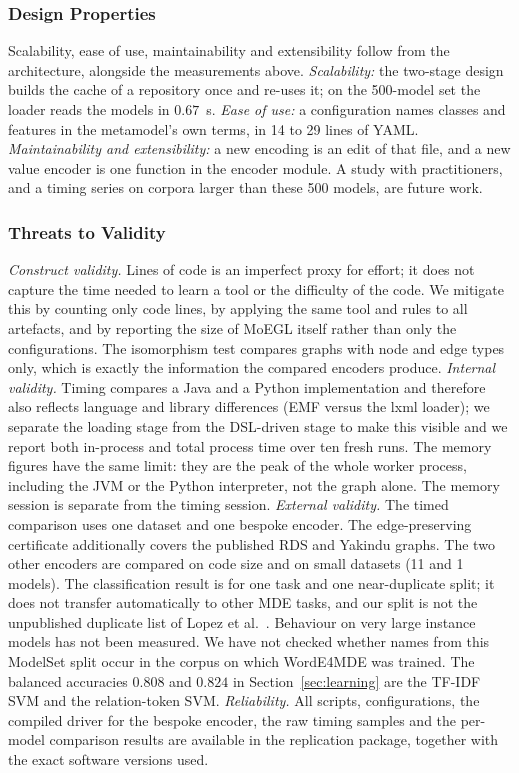 \documentclass[journal,article,submit,moreauthors,technologies]{Definitions/mdpi}
\newcommand{\rev}[1]{#1}
\begin{document}
\subsubsection{\rev{Design Properties}}

\rev{Scalability, ease of use, maintainability and extensibility follow from the architecture, alongside the measurements above. \emph{Scalability:} the two-stage design builds the cache of a repository once and re-uses it; on the 500-model set the loader reads the models in $0.67$~s. \emph{Ease of use:} a configuration names classes and features in the metamodel's own terms, in 14 to 29 lines of YAML. \emph{Maintainability and extensibility:} a new encoding is an edit of that file, and a new value encoder is one function in the encoder module. A study with practitioners, and a timing series on corpora larger than these 500 models, are future work.}

\subsubsection{\rev{Threats to Validity}}

\rev{\emph{Construct validity.} Lines of code is an imperfect proxy for effort; it does not capture the time needed to learn a tool or the difficulty of the code. We mitigate this by counting only code lines, by applying the same tool and rules to all artefacts, and by reporting the size of MoEGL itself rather than only the configurations. The isomorphism test compares graphs with node and edge types only, which is exactly the information the compared encoders produce. \emph{Internal validity.} Timing compares a Java and a Python implementation and therefore also reflects language and library differences (EMF versus the lxml loader); we separate the loading stage from the DSL-driven stage to make this visible and we report both in-process and total process time over ten fresh runs. The memory figures have the same limit: they are the peak of the whole worker process, including the JVM or the Python interpreter, not the graph alone. The memory session is separate from the timing session. \emph{External validity.} The timed comparison uses one dataset and one bespoke encoder. The edge-preserving certificate additionally covers the published RDS and Yakindu graphs. The two other encoders are compared on code size and on small datasets (11 and 1 models). The classification result is for one task and one near-duplicate split; it does not transfer automatically to other MDE tasks, and our split is not the unpublished duplicate list of Lopez et al.~\cite{lopez2022classification}. Behaviour on very large instance models has not been measured. We have not checked whether names from this ModelSet split occur in the corpus on which WordE4MDE was trained. The balanced accuracies $0.808$ and $0.824$ in Section~\ref{sec:learning} are the TF-IDF SVM and the relation-token SVM. \emph{Reliability.} All scripts, configurations, the compiled driver for the bespoke encoder, the raw timing samples and the per-model comparison results are available in the replication package, together with the exact software versions used.}
\end{document}
